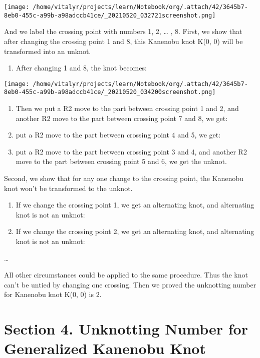 \documentclass[a4paper]{article}
\begin{document}
\begin{center}
\texttt{[image: /home/vitalyr/projects/learn/Notebook/org/.attach/42/3645b7-8eb0-455c-a99b-a98adccb41ce/\_20210520\_032721screenshot.png]}
\end{center}



And we label the crossing point with numbers 1, 2, \ldots{} , 8.
First, we show that after changing the crossing point 1 and 8, this Kanenobu knot K(0, 0) will be transformed into an unknot.
\begin{enumerate}
\item After changing 1 and 8, the knot becomes:
\end{enumerate}

\begin{center}
\texttt{[image: /home/vitalyr/projects/learn/Notebook/org/.attach/42/3645b7-8eb0-455c-a99b-a98adccb41ce/\_20210520\_034200screenshot.png]}
\end{center}
\begin{enumerate}
\item Then we put a R2 move to the part between crossing point 1 and 2, and another R2 move to the part between crossing point 7 and 8, we get:

\item put a R2 move to the part between crossing point 4 and 5, we get:

\item put a R2 move to the part between crossing point 3 and 4, and another R2 move to the part between crossing point 5 and 6, we get the unknot.
\end{enumerate}

Second, we show that for any one change to the crossing point, the Kanenobu knot won't be transformed to the unknot.
\begin{enumerate}
\item If we change the crossing point 1, we get an alternating knot, and alternating knot is not an unknot:

\item If we change the crossing point 2, we get an alternating knot, and alternating knot is not an unknot:
\end{enumerate}
\ldots{}

All other circumstances could be applied to the same procedure. Thus the knot can't be untied by changing one crossing. Then we proved the unknotting number for Kanenobu knot K(0, 0) is 2.
\section{Section 4. Unknotting Number for Generalized Kanenobu Knot}
\label{sec:org67db6df}
\end{document}
